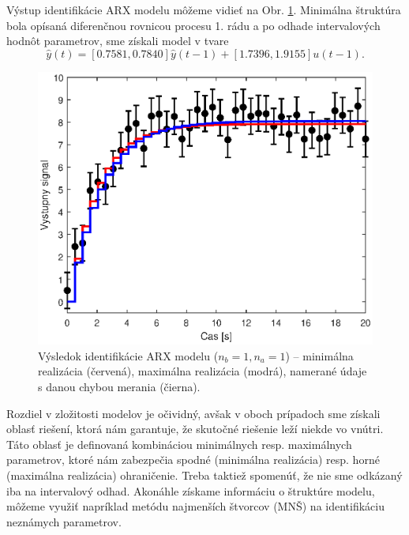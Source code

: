 Výstup identifikácie ARX modelu môžeme vidieť na Obr. \ref{fig:gpe_tf_ex_ARX}. Minimálna štruktúra bola opísaná diferenčnou rovnicou procesu 1. rádu a po odhade intervalových hodnôt parametrov, sme získali model v tvare
\begin{equation*}
	\hat{y}(t) = [0.7581, 0.7840]\hat{y}(t-1) + [1.7396, 1.9155]u(t-1).
\end{equation*}

\begin{figure}
	\centering
	\includegraphics[width=0.7\linewidth]{images/gpe_tf_ex_ARXident}
	\caption{Výsledok identifikácie ARX modelu ($ n_b = 1, n_a = 1 $) -- minimálna realizácia (červená), maximálna realizácia (modrá), namerané údaje s danou chybou merania (čierna).}
	\label{fig:gpe_tf_ex_ARX}
\end{figure}

Rozdiel v zložitosti modelov je očividný, avšak v oboch prípadoch sme získali oblasť riešení, ktorá nám garantuje, že skutočné riešenie leží niekde vo vnútri. Táto oblasť je definovaná kombináciou minimálnych resp. maximálnych parametrov, ktoré nám zabezpečia spodné (minimálna realizácia) resp. horné (maximálna realizácia) ohraničenie. Treba taktiež spomenúť, že nie sme odkázaný iba na intervalový odhad. Akonáhle získame informáciu o štruktúre modelu, môžeme využiť napríklad metódu najmenších štvorcov (MNŠ) na identifikáciu neznámych parametrov. 
